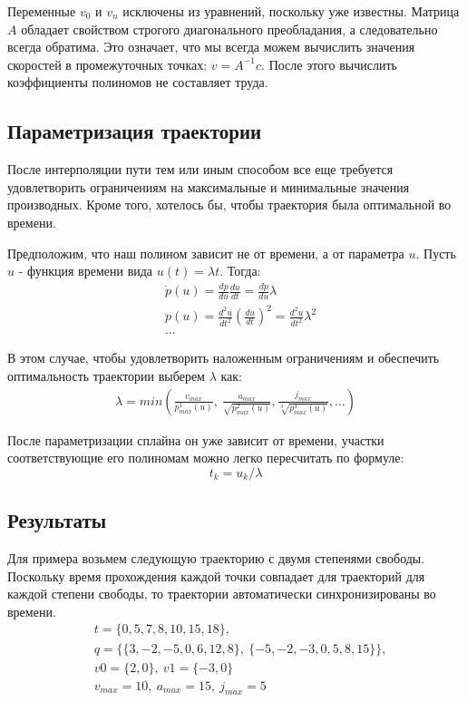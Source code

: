 Переменные $v_{0}$ и $v_{n}$ исключены из уравнений, поскольку уже известны. Матрица $A$ обладает свойством строгого диагонального преобладания\cite{DDMWiki}, а следовательно всегда обратима. Это означает, что мы всегда можем вычислить значения скоростей в промежуточных точках: $v = A^{-1}c$. После этого вычислить коэффициенты полиномов не составляет труда.


\subsection{Параметризация траектории} \label{subsect2_2_2}
После интерполяции пути тем или иным способом все еще требуется удовлетворить ограничениям на максимальные и минимальные значения производных. Кроме того, хотелось бы, чтобы траектория была оптимальной во времени.

Предположим, что наш полином зависит не от времени, а от параметра $u$. Пусть $u$ - функция времени вида $u(t) = \lambda t$. Тогда:
\begin{align*}
	&\dot{p}(u) = \frac{dp}{du}\frac{du}{dt} = \frac{dp}{du}\lambda \\
	&\ddot{p}(u) = \frac{d^{2}u}{dt^{2}}(\frac{du}{dt})^{2} = \frac{d^{2}u}{dt^{2}}\lambda^{2}\\
	&\dotso
\end{align*}

В этом случае, чтобы удовлетворить наложенным ограничениям и обеспечить оптимальность траектории выберем $\lambda$ как:
\begin{align*}
	\lambda = min(\frac{v_{max}}{p_{max}^{1}(u)},\ \frac{a_{max}}{\sqrt{p_{max}^{2}(u)}}, \frac{j_{max}}{\sqrt[3]{p_{max}^{3}(u)}}, \dots)   
\end{align*}

После параметризации сплайна он уже зависит от времени, участки соответствующие его полиномам можно легко пересчитать по формуле:
\[
	t_{k} = u_{k} / \lambda
\]

\subsection{Результаты} \label{subsect2_2_3}
Для примера возьмем следующую траекторию с двумя степенями свободы. Поскольку время прохождения каждой точки совпадает для траекторий для каждой степени свободы, то траектории автоматически синхронизированы во времени.
\begin{align*}
	&t = \{0, 5, 7, 8, 10, 15, 18\},\\
	&q = \{\{3, -2, -5, 0, 6, 12, 8\},\ \{-5, -2, -3, 0, 5, 8, 15\}\},\\
	&v0 = \{2, 0\},\ v1 = \{-3, 0\}\\
	&v_{max} = 10,\ a_{max} = 15,\ j_{max} = 5
\end{align*}

